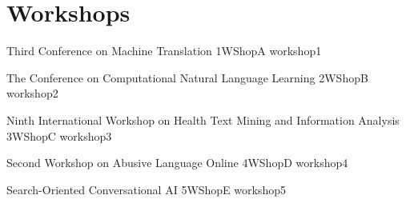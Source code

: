 \chapter[Workshops: \daydate]{Workshops}
\thispagestyle{emptyheader}
\vfill




\clearpage
{}

      \begin{wsschedule}
      {Third Conference on Machine Translation}
      {1}{WShopA}
      {workshop1}
      {\WShopLocA}
      
      \end{wsschedule}
      

      \begin{wsschedule}
      {The Conference on Computational Natural Language Learning}
      {2}{WShopB}
      {workshop2}
      {\WShopLocB}
      
      \end{wsschedule}
       


 \begin{wsschedule}
      {Ninth International Workshop on Health Text Mining and Information Analysis}
      {3}{WShopC}
      {workshop3}
      {\WShopLocC}
      
      \end{wsschedule}
      

      \begin{wsschedule}
      {Second Workshop on Abusive Language Online}
      {4}{WShopD}
      {workshop4}
      {\WShopLocD}
      
      \end{wsschedule}
      

      \begin{wsschedule}
      {Search-Oriented Conversational AI}
      {5}{WShopE}
      {workshop5}
      {\WShopLocE}
      
      \end{wsschedule}
      

